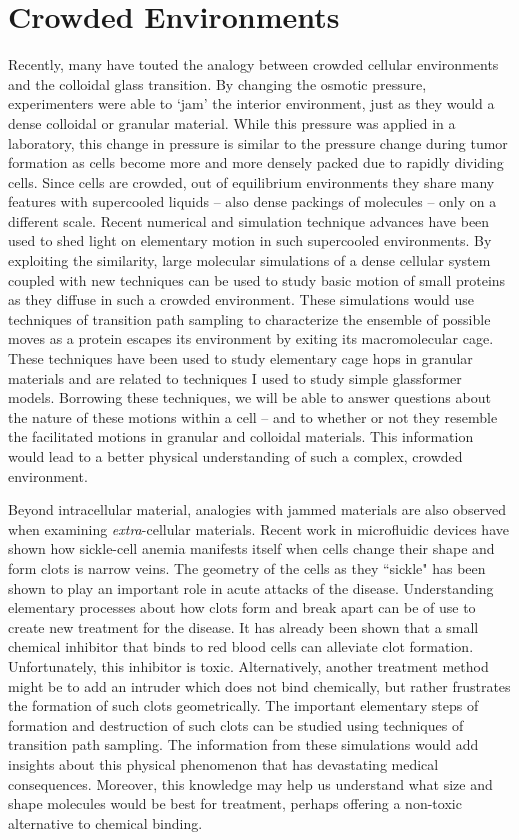 \documentclass[11pt]{article}
\begin{document}
\section{Crowded Environments}
Recently, many have touted the analogy between crowded cellular environments and the colloidal glass transition.  By changing the osmotic pressure, experimenters were able to `jam' the interior environment, just as they would a dense colloidal or granular material.  While this pressure was applied in a laboratory, this change in pressure is similar to the pressure change during tumor formation as cells become more and more densely packed due to rapidly dividing cells.  Since cells are crowded, out of equilibrium environments they share many features with supercooled liquids -- also dense packings of molecules -- only on a different scale.  Recent numerical and simulation technique advances have been used to shed light on elementary motion in such supercooled environments.  By exploiting the similarity, large molecular simulations of a dense cellular system coupled with new techniques can be used to study basic motion of small proteins as they diffuse in such a crowded environment.  These simulations would use techniques of transition path sampling  to characterize the ensemble of possible moves as a protein escapes its environment by exiting its macromolecular cage.  These techniques have been used to study elementary cage hops in granular materials and are related to techniques I used to study simple glassformer models.  Borrowing these techniques, we will be able to answer questions about the nature of these motions within a cell -- and to whether or not they resemble the facilitated motions in granular and colloidal materials.  This information would lead to a better physical understanding of such a complex, crowded environment.   

Beyond intracellular material, analogies with jammed materials are also observed when examining {\textit{ extra}}-cellular materials. Recent work in microfluidic devices have shown how sickle-cell anemia manifests itself when cells change their shape and form clots is narrow veins.  The geometry of the cells as they ``sickle" has been shown to play an important role in acute attacks of the disease.  Understanding elementary processes about how clots form and break apart can be of use to create new treatment for the disease.  It has already been shown that a small chemical inhibitor that binds to red blood cells can alleviate clot formation.  Unfortunately, this inhibitor is toxic.  Alternatively, another treatment method might be to add an intruder which does not bind chemically, but rather frustrates the formation of such clots geometrically.  The important elementary steps of formation and destruction of such clots can be studied using techniques of transition path sampling.  The information from these simulations would add insights about this physical phenomenon that has devastating medical consequences.  Moreover, this knowledge may help us understand what size and shape molecules would be best for treatment, perhaps offering a non-toxic alternative to chemical binding.
\end{document}
